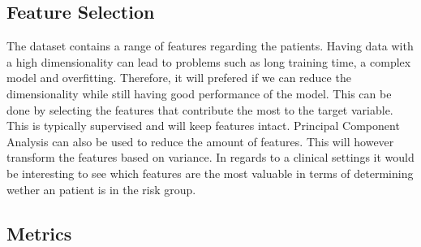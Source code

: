 \subsection{Feature Selection}
The dataset contains a range of features regarding the patients. Having data with a high dimensionality can lead to problems such as long training time, a complex model and overfitting. Therefore, it will prefered if we can reduce the dimensionality while still having good performance of the model. This can be done by selecting the features that contribute the most to the target variable. This is typically supervised and will keep features intact. Principal Component Analysis can also be used to reduce the amount of features. This will however transform the features based on variance. In regards to a clinical settings it would be interesting to see which features are the most valuable in terms of determining wether an patient is in the risk group.

\subsection{Metrics}
